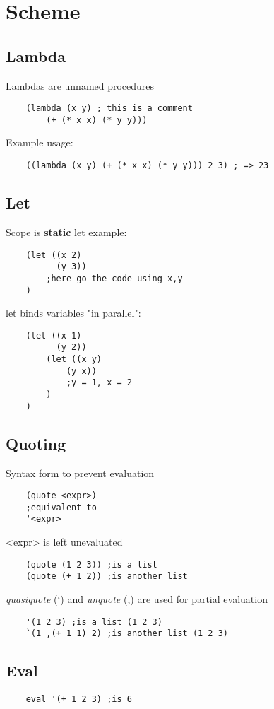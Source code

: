 \section{Scheme}

\subsection{Lambda}
Lambdas are unnamed procedures
\begin{lstlisting}
    (lambda (x y) ; this is a comment
        (+ (* x x) (* y y)))
\end{lstlisting}
Example usage:
\begin{lstlisting}
    ((lambda (x y) (+ (* x x) (* y y))) 2 3) ; => 23
\end{lstlisting}

\subsection{Let}
Scope is \textbf{static}
let example:
\begin{lstlisting}
    (let ((x 2)
          (y 3))
        ;here go the code using x,y
    )
\end{lstlisting}
let binds variables "in parallel":
\begin{lstlisting}
    (let ((x 1)
          (y 2))
        (let ((x y)
            (y x))
            ;y = 1, x = 2 
        )   
    )
\end{lstlisting}

\subsection{Quoting}
Syntax form to prevent evaluation
\begin{lstlisting}
    (quote <expr>)
    ;equivalent to
    '<expr>
\end{lstlisting}
<expr> is left unevaluated
\begin{lstlisting}
    (quote (1 2 3)) ;is a list
    (quote (+ 1 2)) ;is another list
\end{lstlisting}
\textit{quasiquote} (‘) and \textit{unquote} (,) are used for partial evaluation
\begin{lstlisting}
    '(1 2 3) ;is a list (1 2 3)
    `(1 ,(+ 1 1) 2) ;is another list (1 2 3)
\end{lstlisting}

\subsection{Eval}
\begin{lstlisting}
    eval '(+ 1 2 3) ;is 6
\end{lstlisting}

